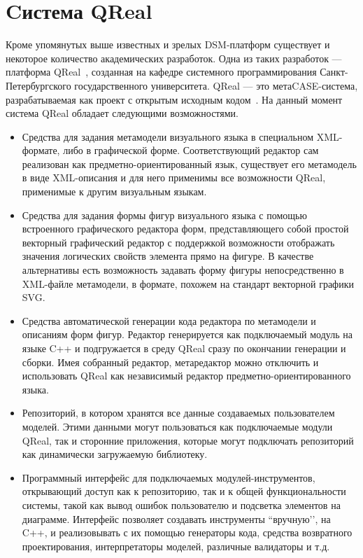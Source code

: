 \documentclass[a4paper]{article}
\begin{document}
\section {Cистема QReal}
Кроме упомянутых выше известных и зрелых DSM-платформ существует и некоторое количество академических разработок. Одна из таких разработок --- платформа QReal~\cite{qReal}, созданная на кафедре системного программирования Санкт-Петербургского государственного университета. QReal --- это метаCASE-система, разрабатываемая как проект с открытым исходным кодом~\cite{qRealGithub}. На данный момент система QReal обладает следующими возможностями.
\begin{itemize}
  \item Средства для задания метамодели визуального  языка в специальном XML-формате, либо в графической форме. Соответствующий редактор сам реализован как предметно-ориентированный язык, существует его метамодель в виде XML-описания и для него применимы все возможности QReal, применимые к другим визуальным языкам.
  \item Средства для задания формы фигур визуального языка с помощью встроенного графического редактора форм, представляющего собой простой векторный графический редактор с поддержкой возможности отображать значения логических свойств элемента прямо на фигуре. В качестве альтернативы есть возможность задавать форму фигуры непосредственно в XML-файле метамодели, в формате, похожем на стандарт векторной графики SVG.
  \item Средства автоматической генерации кода редактора по метамодели и описаниям форм фигур. Редактор генерируется как подключаемый модуль на языке C++ и подгружается в среду QReal сразу по окончании генерации и сборки. Имея собранный редактор, метаредактор можно отключить и использовать QReal как независимый редактор предметно-ориентированного языка.
  \item Репозиторий, в котором хранятся все данные создаваемых пользователем моделей. Этими данными могут пользоваться как подключаемые модули QReal, так и сторонние приложения, которые могут подключать репозиторий как динамически загружаемую библиотеку.
  \item Программный интерфейс для подключаемых модулей-инструментов, открывающий доступ как к репозиторию, так и к общей функциональности системы, такой как вывод ошибок пользователю и подсветка элементов на диаграмме. Интерфейс позволяет создавать инструменты ``вручную’’, на C++, и реализовывать с их помощью генераторы кода, средства возвратного проектирования, интерпретаторы моделей, различные валидаторы и т.д.
\end{itemize}
\end{document}
